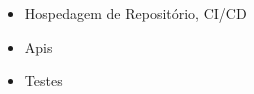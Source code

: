 \documentclass[10pt,a4paper,ragged2e,withhyper]{altacv}
\begin{document}
\begin{paracol}{2}
\begin{itemize}
\item{Hospedagem de Repositório, CI/CD}
\end{itemize}

\divider\smallskip

\begin{itemize}
\item{Apis} 
\end{itemize}

\divider\smallskip

\begin{itemize}
\item{Testes}
\end{itemize}



\medskip




\end{paracol}
\end{document}
